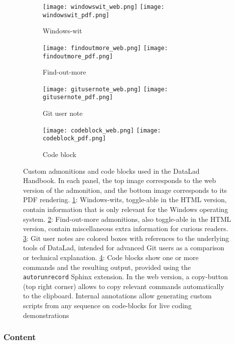 \begin{figure}
	\hfill
	\begin{subfigure}{.44\textwidth}
	\texttt{[image: windowswit\_web.png]}
	\texttt{[image: windowswit\_pdf.png]}
	\caption{Windows-wit}
	\label{fig:handbook-windowswit}
	\end{subfigure}
	\begin{subfigure}{.55\textwidth}
		\texttt{[image: findoutmore\_web.png]}
		\texttt{[image: findoutmore\_pdf.png]}
		\caption{Find-out-more}
		\label{fig:handbook-findoutmore}
	\end{subfigure}
	\hfill
	\begin{subfigure}{.44\textwidth}
	\texttt{[image: gitusernote\_web.png]}
	\texttt{[image: gitusernote\_pdf.png]}
	\caption{Git user note}
	\label{fig:handbook-gitusernote}
	\end{subfigure}
	\hfill
	\begin{subfigure}{.55\textwidth}
	\texttt{[image: codeblock\_web.png]}
	\texttt{[image: codeblock\_pdf.png]}
	\caption{Code block}
	\label{fig:handbook-codeblock}
    \end{subfigure}
	\caption[Customization in the DataLad Handbook]{Custom admonitions and code blocks used in the DataLad Handbook. In each panel, the top image corresponds to the web version of the admonition, and the bottom image corresponds to its PDF rendering.
	\ref{fig:handbook-windowswit}: Windows-wits, toggle-able in the HTML version, contain information that is only relevant for the Windows operating system. \ref{fig:handbook-findoutmore}: Find-out-more admonitions, also toggle-able in the HTML version, contain miscellaneous extra information for curious readers. \ref{fig:handbook-gitusernote}: Git user notes are colored boxes with references to the underlying tools of DataLad, intended for advanced Git users as a comparison or technical explanation.  \ref{fig:handbook-codeblock}: Code blocks show one or more commands and the resulting output, provided using the \texttt{autorunrecord} Sphinx extension. In the web version, a copy-button (top right corner) allows to copy relevant commands automatically to the clipboard. Internal annotations allow generating custom scripts from any sequence on code-blocks for live coding demonstrations}
	\label{fig:handbook-admonitions}
\end{figure}

\subsubsection{Content}

